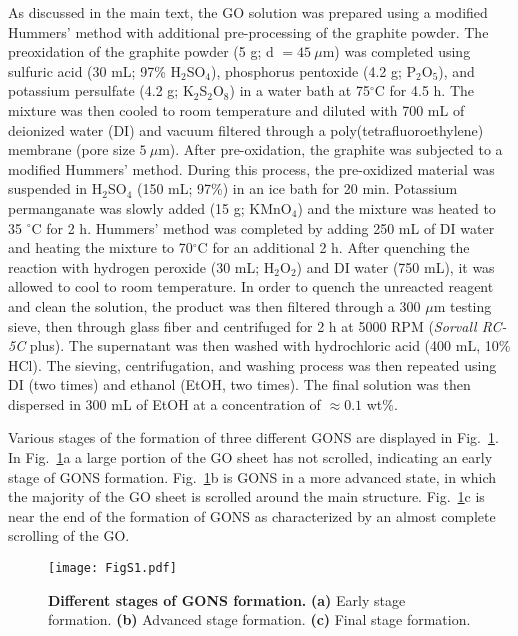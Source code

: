 \justifying
As discussed in the main text, the GO solution was prepared using a modified Hummers' method\cite{Hummers1958} with additional pre-processing of the graphite powder.\cite{Kovtyukhova1999} The preoxidation of the graphite powder (5 g; d $= 45\ \mu$m) was completed using sulfuric acid (30 mL; 97\% H$_{2}$SO$_{4}$), phosphorus pentoxide (4.2 g; P$_{2}$O$_{5}$), and potassium persulfate (4.2 g; K$_{2}$S$_{2}$O$_{8}$) in a water bath at 75$^{\circ}$C for 4.5 h. The mixture was then cooled to room temperature and diluted with 700 mL of deionized water (DI) and vacuum filtered through a poly(tetrafluoroethylene) membrane (pore size $5\ \mu$m). After pre-oxidation, the graphite was subjected to a modified Hummers' method.\cite{Hummers1958} During this process, the pre-oxidized material was suspended in H$_{2}$SO$_{4}$ (150 mL; 97\%) in an ice bath for 20 min. Potassium permanganate was slowly added (15 g; KMnO$_{4}$) and the mixture was heated to 35 $^{\circ}$C for 2 h. Hummers' method was completed by adding 250 mL of DI water and heating the mixture to 70$^{\circ}$C for an additional 2 h. After quenching the reaction with hydrogen peroxide (30 mL; H$_{2}$O$_{2}$) and DI water (750 mL), it was allowed to cool to room temperature. In order to quench the unreacted reagent and clean the solution, the product was then filtered through a 300 $\mu$m testing sieve, then through glass fiber and centrifuged for 2 h at 5000 RPM (\textit{Sorvall RC-5C} plus). The supernatant was then washed with hydrochloric acid (400 mL, 10\% HCl). The sieving, centrifugation, and washing process was then repeated using DI (two times) and ethanol (EtOH, two times). The final solution was then dispersed in 300 mL of EtOH at a concentration of $\approx 0.1$ wt\%.


Various stages of the formation of three different GONS are displayed in Fig.~\ref{figS1_AppB}. In Fig.~\ref{figS1_AppB}a a large portion of the GO sheet has not scrolled, indicating an early stage of GONS formation. Fig.~\ref{figS1_AppB}b is GONS in a more advanced state, in which the majority of the GO sheet is scrolled around the main structure. Fig.~\ref{figS1_AppB}c is near the end of the formation of GONS as characterized by an almost complete scrolling of the GO.

\begin{figure}[h!]
 \centering
 \texttt{[image: FigS1.pdf]}
  \caption{\textbf{Different stages of GONS formation.} \textbf{(a)} Early stage formation. \textbf{(b)} Advanced stage formation. \textbf{(c)} Final stage formation.}
  \label{figS1_AppB}
\end{figure}

